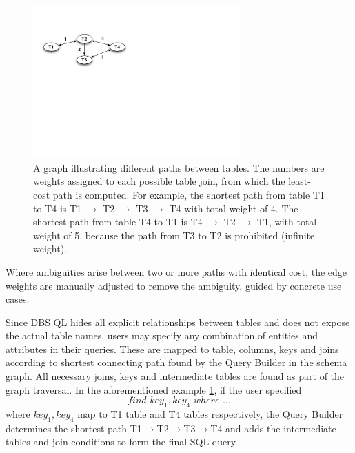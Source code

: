 \documentclass[a4paper]{jpconf}
\begin{document}
\begin{figure}[htb]
\centering
\includegraphics[width=80mm]{DBSSql_shortestpath.pdf}
\caption{A graph illustrating different paths between tables. The
numbers are weights assigned to each possible table join, from which the least-cost path
is computed. For example, the shortest path from table T1 to T4 is 
T1 $\rightarrow$ T2 $\rightarrow$ T3 $\rightarrow$ T4 with total weight 
of 4.  The shortest path from table T4 to T1 is 
T4 $\rightarrow$ T2 $\rightarrow$ T1, with total weight of 5, because the path
from T3 to T2 is prohibited (infinite weight).
}
\label{ShortestPath}
\end{figure}
Where ambiguities arise between two or more paths
with identical cost, the edge weights are manually adjusted to remove the
ambiguity, guided by concrete use cases. 

Since DBS QL hides all explicit relationships between tables and does not
expose the actual table names, users may
specify any combination of entities and attributes in their queries.
These are mapped to table, columns, keys and joins according to
shortest connecting path found by the Query Builder in the schema graph.
All necessary joins, keys and intermediate tables are found as part of the
graph traversal.
In the aforementioned example \ref{ShortestPath},
if the user specified
$$find\,\, key_1, key_4\,\, where\,\, ...$$
where $key_1, key_4$ map to T1 table and T4 tables respectively,
the Query Builder determines
the shortest path 
T1$\rightarrow$T2$\rightarrow$T3$\rightarrow$T4 
and adds the intermediate tables 
and join conditions to form the final SQL query. 
\end{document}
